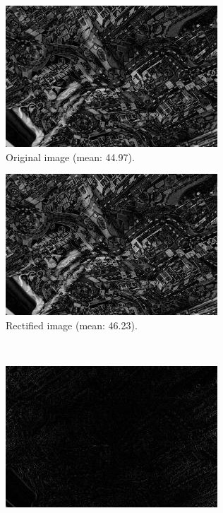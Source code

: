 \begin{figure}[h]
  \centering
  \begin{subfigure}[b]{0.49\textwidth}
    \includegraphics[width=\textwidth]{figures/rect_ru.jpg} 
    \caption{Original image (mean: 44.97).}
    \label{fig:rect_ru}
  \end{subfigure}
  \begin{subfigure}[b]{0.49\textwidth}
    \includegraphics[width=\textwidth]{figures/rect_rw.jpg} 
    \caption{Rectified image (mean: 46.23).}
    \label{fig:rect_rw}
  \end{subfigure}
  \\
  \begin{subfigure}[b]{0.7\textwidth}
    \includegraphics[width=\textwidth]{figures/rect_rdiff.jpg} 

\end{subfigure}
\end{figure}
